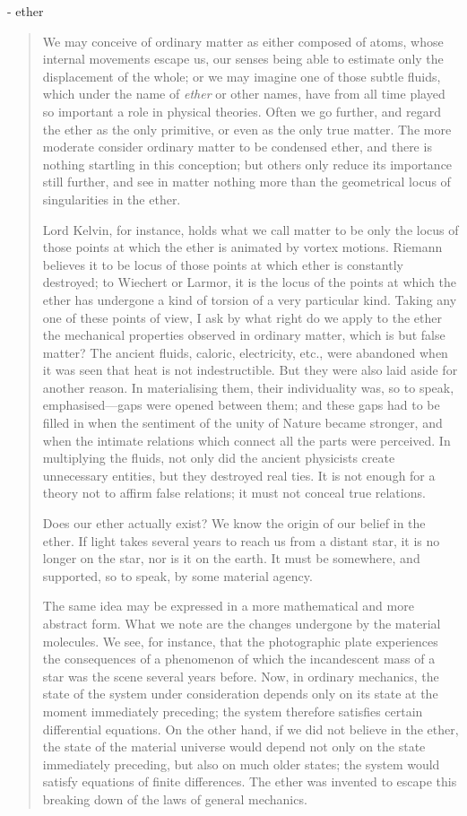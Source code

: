 \documentclass{article}
\begin{document}
 - ether
 
 \begin{quote}
     We may conceive of ordinary matter as either composed of atoms, whose internal movements escape us, our senses being able to estimate only the displacement of the whole; or we may imagine one of those subtle fluids, which under the name of \emph{ether} or other names, have from all time played so important a role in physical theories.  Often we go further, and regard the ether as the only primitive, or even as the only true matter.  The more moderate consider ordinary matter to be condensed ether, and there is nothing startling in this conception; but others only reduce its importance still further, and see in matter nothing more than the geometrical locus of singularities in the ether.  
     
     Lord Kelvin, for instance, holds what we call matter to be only the locus of those points at which the ether is animated by vortex motions.  Riemann believes it to be locus of those points at which ether is constantly destroyed; to Wiechert or Larmor, it is the locus of the points at which the ether has undergone a kind of torsion of a very particular kind.  Taking any one of these points of view, I ask by what right do we apply to the ether the mechanical properties observed in ordinary matter, which is but false matter?  The ancient fluids, caloric, electricity, etc., were abandoned when it was seen that heat is not indestructible.  But they were also laid aside for another reason.  In materialising them, their individuality was, so to speak, emphasised---gaps were opened between them; and these gaps had to be filled in when the sentiment of the unity of Nature became stronger, and when the intimate relations which connect all the parts were perceived.  In multiplying the fluids, not only did the ancient physicists create unnecessary entities, but they destroyed real ties.  It is not enough for a theory not to affirm false relations; it must not conceal true relations.  
     
     Does our ether actually exist?  We know the origin of our belief in the ether.  If light takes several years to reach us from a distant star, it is no longer on the star, nor is it on the earth.  It must be somewhere, and supported, so to speak, by some material agency.
     
     The same idea may be expressed in a more mathematical and more abstract form.  What we note are the changes undergone by the material molecules.  We see, for instance, that the photographic plate experiences the consequences of a phenomenon of which the incandescent mass of a star was the scene several years before.  Now, in ordinary mechanics, the state of the system under consideration depends only on its state at the moment immediately preceding; the system therefore satisfies certain differential equations.  On the other hand, if we did not believe in the ether, the state of the material universe would depend not only on the state immediately preceding, but also on much older states; the system would satisfy equations of finite differences.  The ether was invented to escape this breaking down of the laws of general mechanics.  
     

\end{quote}
\end{document}
